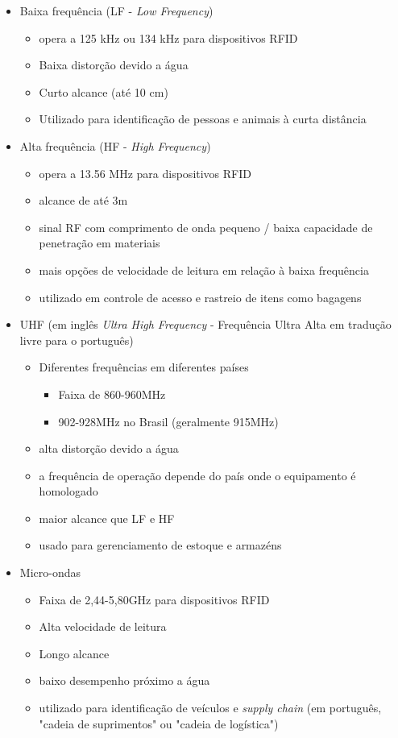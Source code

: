 \begin{itemize}
     \item Baixa frequência (LF - \textit{Low Frequency})
     \begin{itemize}
         \item opera a 125 kHz ou 134 kHz para dispositivos RFID
         \item Baixa distorção devido a água
         \item Curto alcance (até 10 cm)
         \item Utilizado para identificação de pessoas e animais à curta distância
     \end{itemize}
     \item Alta frequência (HF - \textit{High Frequency})
     \begin{itemize}
         \item opera a 13.56 MHz para dispositivos RFID
         \item alcance de até 3m
         \item sinal RF com comprimento de onda pequeno / baixa capacidade de penetração em materiais
         \item mais opções de velocidade de leitura em relação à baixa frequência
         \item utilizado em controle de acesso e rastreio de itens como bagagens
     \end{itemize}
     \item UHF (em inglês \textit{Ultra High Frequency} - Frequência Ultra Alta em tradução livre para o português)
     \begin{itemize}
         \item Diferentes frequências em diferentes países
         \begin{itemize}
             \item Faixa de 860-960MHz
             \item 902-928MHz no Brasil (geralmente 915MHz)
         \end{itemize}
         \item alta distorção devido a água
         \item a frequência de operação depende do país onde o equipamento é homologado
         \item maior alcance que LF e HF
         \item usado para gerenciamento de estoque e armazéns
     \end{itemize}
     \item Micro-ondas
     \begin{itemize}
         \item Faixa de 2,44-5,80GHz para dispositivos RFID
         \item Alta velocidade de leitura
         \item Longo alcance
         \item baixo desempenho próximo a água
         \item utilizado para identificação de veículos e \textit{supply chain} (em português, "cadeia de suprimentos" ou "cadeia de logística")
     \end{itemize}
 \end{itemize}


